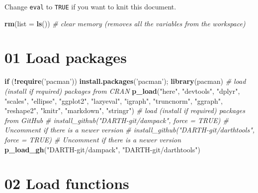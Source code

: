 \documentclass[
]{article}
\newenvironment{Shaded}{\begin{snugshade}}{\end{snugshade}}
\newcommand{\CommentTok}[1]{\textcolor[rgb]{0.56,0.35,0.01}{\textit{#1}}}
\newcommand{\ControlFlowTok}[1]{\textcolor[rgb]{0.13,0.29,0.53}{\textbf{#1}}}
\newcommand{\DataTypeTok}[1]{\textcolor[rgb]{0.13,0.29,0.53}{#1}}
\newcommand{\KeywordTok}[1]{\textcolor[rgb]{0.13,0.29,0.53}{\textbf{#1}}}
\newcommand{\NormalTok}[1]{#1}
\newcommand{\OperatorTok}[1]{\textcolor[rgb]{0.81,0.36,0.00}{\textbf{#1}}}
\newcommand{\StringTok}[1]{\textcolor[rgb]{0.31,0.60,0.02}{#1}}
\begin{document}
\newpage

Change \texttt{eval} to \texttt{TRUE} if you want to knit this document.

\begin{Shaded}
\begin{Highlighting}[]
\KeywordTok{rm}\NormalTok{(}\DataTypeTok{list =} \KeywordTok{ls}\NormalTok{())      }\CommentTok{# clear memory (removes all the variables from the workspace)}
\end{Highlighting}
\end{Shaded}

\hypertarget{load-packages}{%
\section{01 Load packages}\label{load-packages}}

\begin{Shaded}
\begin{Highlighting}[]
\ControlFlowTok{if}\NormalTok{ (}\OperatorTok{!}\KeywordTok{require}\NormalTok{(}\StringTok{'pacman'}\NormalTok{)) }\KeywordTok{install.packages}\NormalTok{(}\StringTok{'pacman'}\NormalTok{); }\KeywordTok{library}\NormalTok{(pacman) }
\CommentTok{# load (install if required) packages from CRAN}
\KeywordTok{p_load}\NormalTok{(}\StringTok{"here"}\NormalTok{, }\StringTok{"devtools"}\NormalTok{, }\StringTok{"dplyr"}\NormalTok{, }\StringTok{"scales"}\NormalTok{, }\StringTok{"ellipse"}\NormalTok{, }\StringTok{"ggplot2"}\NormalTok{, }\StringTok{"lazyeval"}\NormalTok{, }\StringTok{"igraph"}\NormalTok{, }\StringTok{"truncnorm"}\NormalTok{, }\StringTok{"ggraph"}\NormalTok{, }\StringTok{"reshape2"}\NormalTok{, }\StringTok{"knitr"}\NormalTok{, }\StringTok{"markdown"}\NormalTok{, }\StringTok{"stringr"}\NormalTok{)}
\CommentTok{# load (install if required) packages from GitHub}
\CommentTok{# install_github("DARTH-git/dampack", force = TRUE) # Uncomment if there is a newer version}
\CommentTok{# install_github("DARTH-git/darthtools", force = TRUE) # Uncomment if there is a newer version}
\KeywordTok{p_load_gh}\NormalTok{(}\StringTok{"DARTH-git/dampack"}\NormalTok{, }\StringTok{"DARTH-git/darthtools"}\NormalTok{)}
\end{Highlighting}
\end{Shaded}

\hypertarget{load-functions}{%
\section{02 Load functions}\label{load-functions}}
\end{document}
